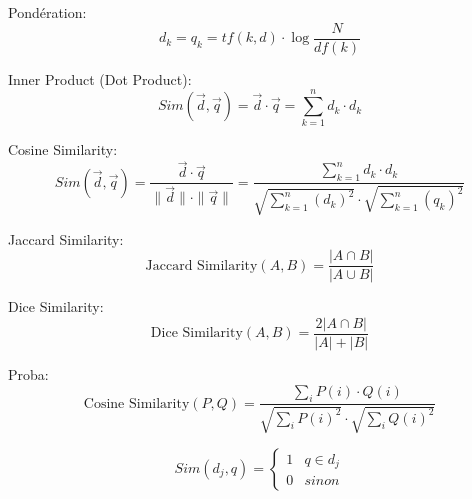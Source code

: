 \documentclass{article}
\begin{document}
Pondération:
\[
    d_{k} = q_{k} = tf(k, d) \cdot \log{\frac{N}{df{(k)}}}
\]

Inner Product (Dot Product):
\[
    Sim(\vec{d}, \vec{q}) = \vec{d} \cdot \vec{q} = \sum_{k=1}^{n} d_{k} \cdot d_{k}
\]

Cosine Similarity:
\[
    Sim(\vec{d}, \vec{q}) = \frac{\vec{d} \cdot \vec{q}}{\|\vec{d}\| \cdot \|\vec{q}\|} = \frac{\sum_{k=1}^{n} d_{k} \cdot d_{k}}{\sqrt{\sum_{k=1}^{n} (d_{k})^2} \cdot \sqrt{\sum_{k=1}^{n} (q_{k})^2}}
\]

Jaccard Similarity:
\[
    \text{Jaccard Similarity}(A, B) = \frac{|A \cap B|}{|A \cup B|}
\]

Dice Similarity:
\[
    \text{Dice Similarity}(A, B) = \frac{2 |A \cap B|}{|A| + |B|}
\]

Proba:
\[
    \text{Cosine Similarity}(P, Q) = \frac{\sum_{i} P(i) \cdot Q(i)}{\sqrt{\sum_{i} P(i)^2} \cdot \sqrt{\sum_{i} Q(i)^2}}
\]

\[
    Sim(d_{j}, q) = \left\{
        \begin{array}{ll}
            1 & q \in d_{j}\\
            0 & sinon
        \end{array}
        \right.
\]
\end{document}
